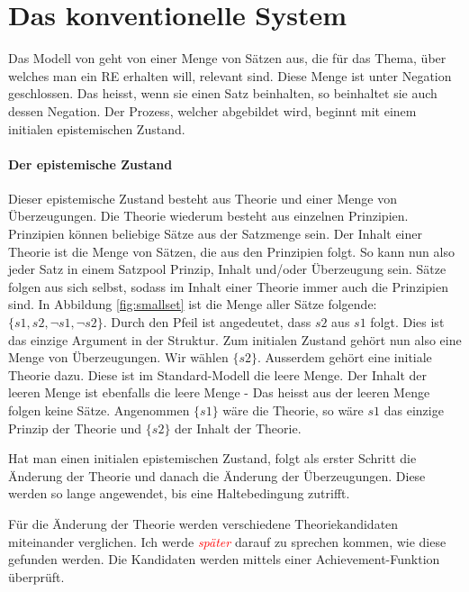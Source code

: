 \documentclass{article}
\begin{document}
\section{Das konventionelle System}

Das Modell von \citeauthor{beisbart_making_2015} geht von einer Menge von Sätzen aus, die für das Thema, über welches man ein RE erhalten will, relevant sind. Diese Menge ist unter Negation geschlossen. Das heisst, wenn sie einen Satz beinhalten, so beinhaltet sie auch dessen Negation.
Der Prozess, welcher abgebildet wird, beginnt mit einem initialen epistemischen Zustand.

\paragraph{Der epistemische Zustand} Dieser epistemische Zustand besteht aus Theorie und einer Menge von Überzeugungen. Die Theorie wiederum besteht aus einzelnen Prinzipien. Prinzipien können beliebige Sätze aus der Satzmenge sein. Der Inhalt einer Theorie ist die Menge von Sätzen, die aus den Prinzipien folgt. So kann nun also jeder Satz in einem Satzpool Prinzip, Inhalt und/oder Überzeugung sein. Sätze folgen aus sich selbst, sodass im Inhalt einer Theorie immer auch die Prinzipien sind. In Abbildung \ref{fig:smallset} ist die Menge aller Sätze folgende: $\{s1,s2,\neg s1, \neg s2\}$. Durch den Pfeil ist angedeutet, dass $s2$ aus $s1$ folgt. Dies ist das einzige Argument in der Struktur. Zum initialen Zustand gehört nun also eine Menge von Überzeugungen. Wir wählen $\{s2\}$. Ausserdem gehört eine initiale Theorie dazu. Diese ist im Standard-Modell die leere Menge. Der Inhalt der leeren Menge ist ebenfalls die leere Menge - Das heisst aus der leeren Menge folgen keine Sätze. Angenommen $\{s1\}$ wäre die Theorie, so wäre $s1$ das einzige Prinzip der Theorie und $\{s2\}$ der Inhalt der Theorie.

Hat man einen initialen epistemischen Zustand, folgt als erster Schritt die Änderung der Theorie und danach die Änderung der Überzeugungen. Diese werden so lange angewendet, bis eine Haltebedingung zutrifft.\autocite[S.~10]{beisbart_making_2015}

Für die Änderung der Theorie werden verschiedene Theoriekandidaten miteinander verglichen. Ich werde \textit{\textcolor{red}{später}} darauf zu sprechen kommen, wie diese gefunden werden. Die Kandidaten werden mittels einer Achievement-Funktion überprüft.
\end{document}
